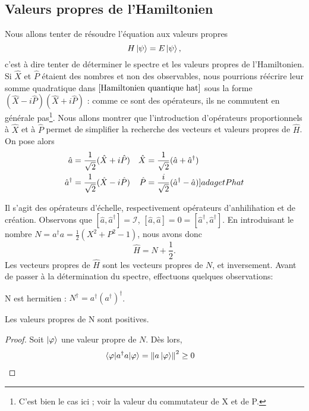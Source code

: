 \documentclass[../Notesdecours.tex]{subfiles}
\begin{document}
\subsection{Valeurs propres de l'Hamiltonien}
Nous allons tenter de résoudre l'équation aux valeurs propres 
\begin{equation}
    H\ket{\psi} = E\ket{\psi},
\end{equation}
c'est à dire tenter de déterminer le spectre et les valeurs propres de l'Hamiltonien.\\

Si $\hat{X}$ et $\hat{P}$ étaient des nombres et non des observables, nous pourrions réécrire leur somme quadratique dans $\eqref{Hamiltonien quantique hat}$ sous la forme $(\hat{X}-i\hat{P})(\hat{X}+i\hat{P})$ : comme ce sont des opérateurs, ils ne commutent en générale pas\footnote{C'est bien le cas ici ; voir la valeur du commutateur de X et de P.}. Nous allons montrer que l'introduction d'opérateurs proportionnels à $\hat{X}$ et à $\hat{P}$ permet de simplifier la recherche des vecteurs et valeurs propres de $\hat{H}$. On pose alors
\begin{align}
    \hat{a} &= \frac{1}{\sqrt{2}}(\hat{X}+i\hat{P})   & \hat{X} &= \frac{1}{\sqrt{2}}(\hat{a}+\hat{a}^\dagger)\label{a et X hat}\\
    \hat{a}^\dagger &= \frac{1}{\sqrt{2}}(\hat{X}-i\hat{P})    & \hat{P} &= \frac{i}{\sqrt{2}}(\hat{a}^\dagger-\hat{a}) \label[]{a dag et P hat}
\end{align}

Il s'agit des opérateurs d'échelle, respectivement opérateurs d'anhilihation et de création. Observons que $[\hat{a},\hat{a}^\dagger] = \mathcal{I}$, $[\hat{a},\hat{a}] = 0 = [\hat{a}^\dagger,\hat{a}^\dagger]$. En introduisant le nombre $N = a^\dagger a = \frac{1}{2}\left(X^2+P^2-1\right)$, nous avons donc
\begin{equation}
    \hat{H} = N+\frac{1}{2}.
\end{equation}
Les vecteurs propres de $\hat{H}$ sont les vecteurs propres de $N$, et inversement. Avant de passer à la détermination du spectre, effectuons quelques observations:
\begin{Property}
    N est hermitien : $N^\dagger = a^\dagger \left(a^\dagger\right)^\dagger$.
\end{Property}
\begin{Property}
    \label{N positif}
    Les valeurs propres de N sont positives.
\end{Property}
\begin{proof}
    Soit $\ket{\varphi}$ une valeur propre de $N$. Dès lors,
    \begin{align*}
        \braket{\varphi|a^\dagger a|\varphi} &= \norm{a\ket{\varphi}}^2 \geq 0
    \end{align*}
\end{proof}
\end{document}
